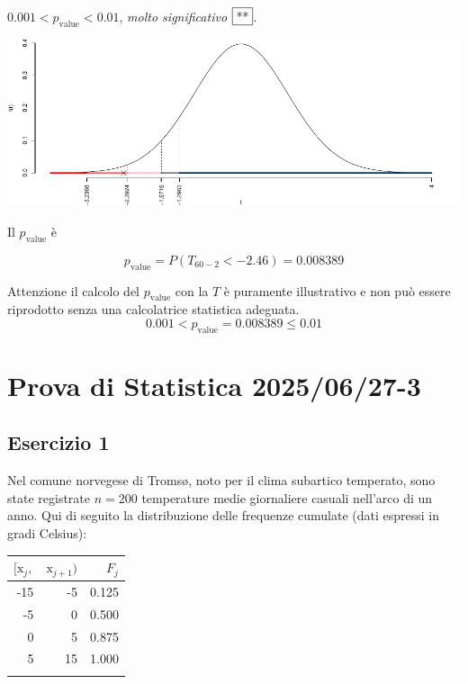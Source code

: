 \documentclass[
  11pt,
]{book}
\theoremstyle{mytheoremstyle}
\theoremstyle{mydefstyle}
\newenvironment{sol}
  {
  \begin{tcolorbox}[enhanced,breakable,arc=0.1mm,boxrule=1pt,colback=white,colframe=iblue,
  title=\bf \fontfamily{lmss}\selectfont \hspace{.5 cm} Soluzione,drop fuzzy shadow]

}{
\end{tcolorbox}
  }
\begin{document}
\begin{sol}
\(0.001<p_\text{value}<0.01\), \emph{molto significativo} \(\fbox{**}\).

\begin{center}\includegraphics{Esami_passati_con_soluzioni_files/figure-latex/unnamed-chunk-80-1} \end{center}

Il \(p_{\text{value}}\) è

\[ p_{\text{value}} = P(T_{60-2}<-2.46)=0.008389 \]

Attenzione il calcolo del \(p_\text{value}\) con la \(T\) è puramente illustrativo e non può essere riprodotto senza una calcolatrice statistica adeguata.\[
 0.001 < p_\text{value}= 0.008389 \leq 0.01 
\]

\end{sol}

\section{Prova di Statistica 2025/06/27-3}\label{prova-di-statistica-20250627-3}

\subsection{Esercizio 1}\label{esercizio-1-48}

Nel comune norvegese di Tromsø, noto per il clima subartico temperato, sono state registrate \(n=200\) temperature medie giornaliere casuali nell'arco di un anno. Qui di seguito la distribuzione delle frequenze cumulate (dati espressi in gradi Celsius):

\begin{table}[H]
\centering
\begin{tabular}{rrr}
\toprule
$[\text{x}_j,$ & $\text{x}_{j+1})$ & $F_j$\\
\midrule
-15 & -5 & 0.125\\
-5 & 0 & 0.500\\
0 & 5 & 0.875\\
5 & 15 & 1.000\\
 &  & \\
\bottomrule
\end{tabular}
\end{table}
\end{document}
